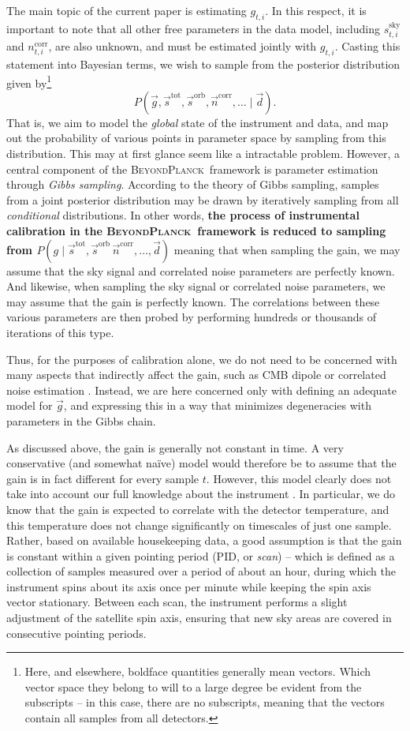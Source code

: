 \documentclass[twocolumn]{aa}
\renewcommand{\d}[0]{\vec{d}}
\newcommand{\n}[0]{\vec{n}}
\newcommand{\s}[0]{\vec{s}}
\newcommand{\g}[0]{\vec{g}}
\newcommand{\BP}{\textsc{BeyondPlanck}}
\newcommand{\ti}[0]{_{t, i}}
\newcommand{\tot}[0]{^{\mathrm{tot}}}
\newcommand{\corr}[0]{^{\mathrm{corr}}}
\newcommand{\sky}[0]{^{\mathrm{sky}}}
\newcommand{\orb}[0]{^{\mathrm{orb}}}
\begin{document}
The main topic of the current paper is estimating $g\ti$. In this respect, it is important to note that all other free parameters in the data model, including $s\ti\sky$ and $n\ti\corr$, are also unknown, and must be estimated jointly with $g\ti$. Casting this statement into Bayesian terms, we wish to sample from the posterior distribution given by\footnote{Here, and elsewhere, boldface quantities generally mean vectors. Which vector space they belong to will to a large degree be evident from the subscripts -- in this case, there are no subscripts, meaning that the vectors contain all samples from all detectors.}
\begin{equation}
    P(\g, \s\tot, \s\orb, \n\corr, \ldots \mid \d).
\end{equation}
That is, we aim to model the \emph{global} state of the instrument and data, and map out the probability of various points in parameter space by sampling from this distribution. This may at first glance seem like a intractable problem. However, a central component of the \BP\ framework is parameter estimation through \emph{Gibbs sampling}. According to the theory of Gibbs sampling, samples from a joint posterior distribution may be drawn by iteratively sampling from all \emph{conditional} distributions. In other words, \textbf{the process of instrumental calibration in the \BP\ framework is reduced to sampling from $P(g \mid \s\tot,\s\orb\,\n\corr,\ldots, \d)$} meaning that when sampling the gain, we may assume that the sky signal and correlated noise parameters are perfectly known. And likewise, when sampling the sky signal or correlated noise parameters, we may assume that the gain is perfectly known. The correlations between these various parameters are then probed by performing hundreds or thousands of iterations of this type. 

Thus, for the purposes of calibration alone, we do not need to be
concerned with many aspects that indirectly affect the gain, such as
CMB dipole or correlated noise estimation
\citep{planck2013-p02,planck2014-a06,planck2016-l02}. Instead, we are
here concerned only with defining an adequate model for $\g$, and
expressing this in a way that minimizes degeneracies with parameters
in the Gibbs chain. 

As discussed above, the gain is generally not constant in time. A very conservative (and somewhat na\"ive) model would therefore be to assume that the gain is in fact different for every sample $t$. However, this model clearly does not take into account our full knowledge about the instrument \citep{planck2013-p05}. In particular, we do know that the gain is expected to correlate with the detector temperature, and this temperature does not change significantly on timescales of just one sample. Rather, based on available housekeeping data, a good assumption is that the gain is constant within a given pointing period (PID, or \emph{scan}) -- which is defined as a collection of samples measured over a period of about an hour, during which the instrument spins about its axis once per minute while keeping the spin axis vector stationary. Between each scan, the instrument performs a slight adjustment of the satellite spin axis, ensuring that new sky areas are covered in consecutive pointing periods. 
\end{document}
